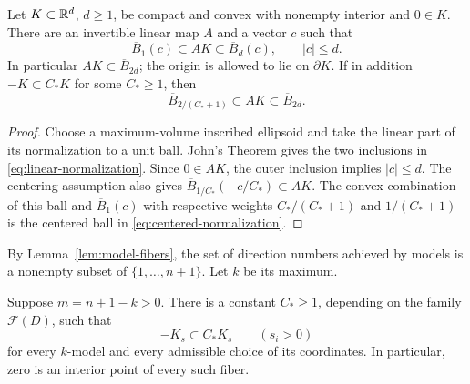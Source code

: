 \begin{lemma}\label{lem:linear-normalization}
Let $K\subset\mathbb R^d$, $d\ge1$, be compact and convex with nonempty
interior and $0\in K$.  There are an invertible linear map $A$ and
a vector $c$ such that
\begin{equation}\label{eq:linear-normalization}
 \overline B_1(c)\subset AK\subset\overline B_d(c),
 \qquad |c|\le d.
\end{equation}
In particular $AK\subset\overline B_{2d}$; the origin is allowed
to lie on $\partial K$.
If in addition $-K\subset C_*K$ for some $C_*\ge1$, then
\begin{equation}\label{eq:centered-normalization}
 \overline B_{2/(C_*+1)}
 \subset AK\subset\overline B_{2d}.
\end{equation}
\end{lemma}

\begin{proof}
Choose a maximum-volume inscribed ellipsoid and take the linear
part of its normalization to a unit ball.  John's Theorem gives
the two inclusions in \eqref{eq:linear-normalization}.  Since
$0\in AK$, the outer inclusion implies $|c|\le d$.
The centering assumption also gives
$\overline B_{1/C_*}(-c/C_*)\subset AK$.  The convex combination of
this ball and $\overline B_1(c)$ with respective weights
$C_*/(C_*+1)$ and $1/(C_*+1)$ is the centered ball in
\eqref{eq:centered-normalization}.
\end{proof}

By Lemma~\ref{lem:model-fibers}, the set of direction numbers achieved
by models is a nonempty subset of $\{1,\ldots,n+1\}$.  Let $k$ be
its maximum.

\begin{proposition}
\label{prop:centering}
Suppose $m=n+1-k>0$.  There is a constant $C_*\ge1$, depending on
the family $\mathcal F(D)$, such that
\begin{equation}\label{eq:model-centering}
 -K_s\subset C_*K_s
 \qquad(s_i>0)
\end{equation}
for every $k$-model and every admissible choice of its coordinates.
In particular, zero is an interior point of every such fiber.
\end{proposition}

